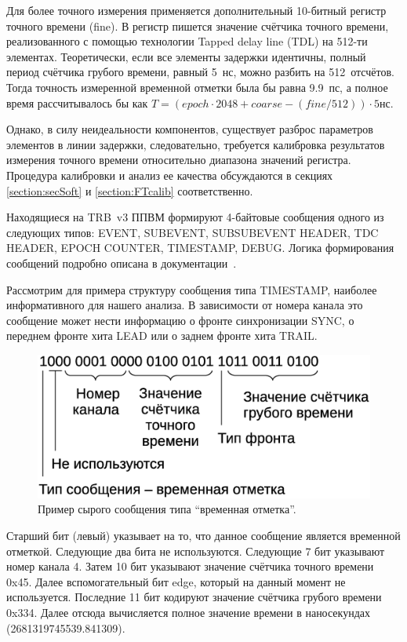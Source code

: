 Для более точного измерения применяется дополнительный 10-битный регистр точного времени (fine). В регистр пишется значение счётчика точного времени, реализованного с помощью технологии Tapped delay line (TDL) на 512-ти элементах. Теоретически, если все элементы задержки идентичны, полный период счётчика грубого времени, равный 5~нс, можно разбить на 512~отсчётов. Тогда точность измеренной временной отметки была бы равна 9.9~пс, а полное время рассчитывалось бы как $ T = (epoch \cdot 2048 + coarse - (fine/512)) \cdot 5 $нс.

Однако, в силу неидеальности компонентов, существует разброс параметров элементов в линии задержки, следовательно, требуется калибровка результатов измерения точного времени относительно диапазона значений регистра. Процедура калибровки и анализ ее качества обсуждаются в секциях \ref{section:secSoft} и \ref{section:FTcalib} соответственно.

Находящиеся на TRB~v3 ППВМ формируют 4-байтовые сообщения одного из следующих типов: EVENT, SUBEVENT, SUBSUBEVENT HEADER, TDC HEADER, EPOCH COUNTER, TIMESTAMP, DEBUG. Логика формирования сообщений подробно описана в документации~\cite{}.

Рассмотрим для примера структуру сообщения типа TIMESTAMP, наиболее информативного для нашего анализа. В зависимости от номера канала это сообщение может нести информацию о фронте синхронизации SYNC, о переднем фронте хита LEAD или о заднем фронте хита TRAIL.

\begin{figure}
\includegraphics[width=1.0\textwidth]{pictures/8_Unpacking.eps}
\caption{Пример сырого сообщения типа ``временная отметка''.}
\label{fig:Unpacking}
\end{figure}

Старший бит (левый) указывает на то, что данное сообщение является временной отметкой. Следующие два бита не используются. Следующие 7 бит указывают номер канала 4. Затем 10 бит указывают значение счётчика точного времени 0x45. Далее вспомогательный бит edge, который на данный момент не используется. Последние 11 бит кодируют значение счётчика грубого времени 0x334. Далее отсюда вычисляется полное значение времени в наносекундах (2681319745539.841309).

